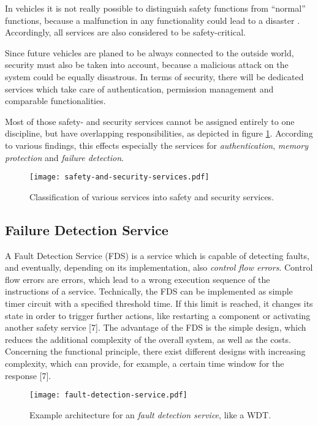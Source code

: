 In vehicles it is not really possible to distinguish safety functions from ``normal'' functions, because a malfunction in any functionality could lead to a disaster \cite{iso26262:course2}. Accordingly, all services are also considered to be safety-critical.

Since future vehicles are planed to be always connected to the outside world, security must also be taken into account, because a malicious attack on the system could be equally disastrous. In terms of security, there will be dedicated services which take care of authentication, permission management and comparable functionalities.

Most of those safety- and security services cannot be assigned entirely to one discipline, but have overlapping responsibilities, as depicted in figure \ref{fig:safety-and-security-services}. According to various findings, this effects especially the services for \emph{authentication}, \emph{memory protection} and \emph{failure detection}.

\begin{figure}[!htbp]
\centering
\texttt{[image: safety-and-security-services.pdf]}
\caption{Classification of various services into safety and security services.}
\label{fig:safety-and-security-services}
\end{figure}




\subsection{Failure Detection Service}

A Fault Detection Service (FDS) is a service which is capable of detecting faults, and eventually, depending on its implementation, also \emph{control flow errors}. Control flow errors are errors, which lead to a wrong execution sequence of the instructions of a service. Technically, the FDS can be implemented as simple timer circuit with a specified threshold time. If this limit is reached, it changes its state in order to trigger further actions, like restarting a component or activating another safety service [7]. The advantage of the FDS is the simple design, which reduces the additional complexity of the overall system, as well as the costs. Concerning the functional principle, there exist different designs with increasing complexity, which can provide, for example, a certain time window for the response [7].


\begin{figure}[!htbp]
\centering
\texttt{[image: fault-detection-service.pdf]}
\caption{Example architecture for an \emph{fault detection service}, like a WDT.}
\label{fig:fault-detection-service}
\end{figure}

